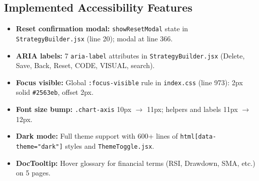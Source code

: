 \documentclass[10pt,a4paper]{article}
\begin{document}
\subsection{Implemented Accessibility Features}

\begin{itemize}[nosep]
  \item \textbf{Reset confirmation modal:} \texttt{showResetModal} state in \texttt{StrategyBuilder.jsx} (line 20); modal at line 366.
  \item \textbf{ARIA labels:} 7 \texttt{aria-label} attributes in \texttt{StrategyBuilder.jsx} (Delete, Save, Back, Reset, CODE, VISUAL, search).
  \item \textbf{Focus visible:} Global \texttt{:focus-visible} rule in \texttt{index.css} (line 973): 2px solid \texttt{\#2563eb}, offset 2px.
  \item \textbf{Font size bump:} \texttt{.chart-axis} 10px $\to$ 11px; helpers and labels 11px $\to$ 12px.
  \item \textbf{Dark mode:} Full theme support with 600+ lines of \texttt{html[data-theme="dark"]} styles and \texttt{ThemeToggle.jsx}.
  \item \textbf{DocTooltip:} Hover glossary for financial terms (RSI, Drawdown, SMA, etc.) on 5 pages.
\end{itemize}
\end{document}
